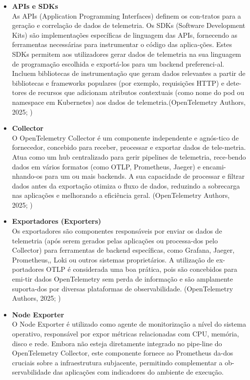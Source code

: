 \begin{itemize}
    \item \textbf{APIs e SDKs} \\ As APIs (Application Programming Interfaces) definem os con-tratos para a geração e correlação de dados de telemetria. Os SDKs (Software Development Kits) são implementações específicas de linguagem das APIs, fornecendo as ferramentas necessárias para instrumentar o código das aplica-ções. Estes SDKs permitem aos utilizadores gerar dados de telemetria na sua linguagem de programação escolhida e exportá-los para um backend preferenci-al. Incluem bibliotecas de instrumentação que geram dados relevantes a partir de bibliotecas e frameworks populares (por exemplo, requisições HTTP) e dete-tores de recursos que adicionam atributos contextuais (como nome do pod ou namespace em Kubernetes) aos dados de telemetria.(OpenTelemetry Authors, 2025; \cite{Thakur2022})
    
    \item \textbf{Collector} \\ O OpenTelemetry Collector é um componente independente e agnós-tico de fornecedor, concebido para receber, processar e exportar dados de tele-metria. Atua como um hub centralizado para gerir pipelines de telemetria, rece-bendo dados em vários formatos (como OTLP, Prometheus, Jaeger) e encami-nhando-os para um ou mais backends. A sua capacidade de processar e filtrar dados antes da exportação otimiza o fluxo de dados, reduzindo a sobrecarga nas aplicações e melhorando a eficiência geral. (OpenTelemetry Authors, 2025; \cite{Thakur2022})
    
    \item \textbf{Exportadores (Exporters)} \\ Os exportadores são componentes responsáveis por enviar os dados de telemetria (após serem gerados pelas aplicações ou processa-dos pelo Collector) para ferramentas de backend específicas, como Grafana, Jaeger, Prometheus,, Loki ou outros sistemas proprietários. A utilização de ex-portadores OTLP é considerada uma boa prática, pois são concebidos para emi-tir dados OpenTelemetry sem perda de informação e são amplamente suporta-dos por diversas plataformas de observabilidade. (OpenTelemetry Authors, 2025; \cite{Thakur2022})
    
    \item \textbf{Node Exporter} \\ O Node Exporter é utilizado como agente de monitorização a nível do sistema operativo, responsável por expor métricas relacionadas com CPU, memória, disco e rede. Embora não esteja diretamente integrado no pipe-line do OpenTelemetry Collector, este componente fornece ao Prometheus da-dos cruciais sobre a infraestrutura subjacente, permitindo complementar a ob-servabilidade das aplicações com indicadores do ambiente de execução.
    

\end{itemize}
